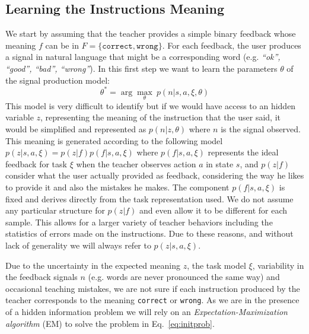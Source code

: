 \subsection{Learning the Instructions Meaning}
%
We start by assuming that the teacher provides a simple binary feedback whose meaning $f$ can be in $F=\{\texttt{correct},\texttt{wrong}\}$. For each feedback, the user produces a signal in natural language that might be a corresponding word (e.g. \textit{``ok'', ``good'', ``bad'', ``wrong''}). In this first step we want to learn the parameters $\theta$ of the signal production model:
% 
\begin{equation}
\theta^* = \arg\max_\theta~p(n|s,a,\xi,\theta)
\label{eq:initprob}
\end{equation}
%
This model is very difficult to identify but if we would have access to an hidden variable $z$, representing the meaning of the instruction that the user said, it would be simplified and represented as $p(n|z,\theta)$ where $n$ is the signal observed. This meaning is generated according to the following model $p(z|s,a,\xi)=p(z|f)p(f|s,a,\xi)$ where $p(f|s,a,\xi)$ represents the ideal feedback for task $\xi$ when the teacher observes action $a$ in state $s$, and $p(z|f)$ consider what the user actually provided as feedback, considering the way he likes to provide it and also the mistakes he makes. The component $p(f|s,a,\xi)$ is fixed and derives directly from the task representation used. We do not assume any particular structure for $p(z|f)$ and even allow it to be different for each sample. This allows for a larger variety of teacher behaviors including the statistics of errors made on the instructions. Due to these reasons, and without lack of generality we will always refer to $p(z|s,a,\xi)$.

Due to the uncertainty in the expected meaning $z$, the task model $\xi$, variability in the feedback signals $n$ (e.g. words are never pronounced the same way) and occasional teaching mistakes, we are not sure if each instruction produced by the teacher corresponds to the meaning \texttt{correct} or \texttt{wrong}. As we are in the presence of a hidden information problem we will rely on an \textit{Expectation-Maximization algorithm} (EM) to solve the problem in Eq.~\ref{eq:initprob}.

